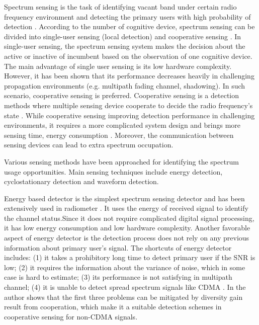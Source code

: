 Spectrum sensing is the task of identifying vacant band under certain radio frequency environment and detecting the primary users with high probability of detection  \cite{umar2012spectrum}. 
According to the number of cognitive device, spectrum sensing can be divided into single-user sensing (local detection) and cooperative sensing \cite{wang2011advances, akyildiz2011cooperative, ma2008soft, axell2010overview}. In single-user sensing, the spectrum sensing system makes the decision about the active or inactive of incumbent based on the observation of one cognitive device. The main advantage of single user sensing is its low hardware complexity. However, it has been shown that its performance decreases heavily in challenging propagation environments (e.g. multipath fading channel, shadowing). In such scenario, cooperative sensing is preferred. Cooperative sensing is a detection methods where multiple sensing device cooperate to decide the radio frequency's state \cite{ganesan2005cooperative, arslan2007cognitive}. While cooperative sensing improving detection performance in challenging environments, it requires a more complicated system design and brings more sensing time, energy consumption \cite{akyildiz2011cooperative}.  
Moreover, the communication between sensing devices can lead to extra spectrum occupation. 

Various sensing methods have been approached for identifying the spectrum usage opportunities. Main sensing techniques include  energy detection, cyclostationary detection and waveform detection. 

Energy based detector is the simplest spectrum sensing detector and has been extensively used in radiometer \cite{cabric2004implementation, poor1994introduction, urkowitz1967energy}. It uses the energy of received signal to identify the channel status.Since it does not require complicated digital signal processing, it has low energy consumption and low hardware complexity.  Another favorable aspect of energy detector is the detection process does not rely on  any previous information about primary user's signal.  
The shortcuts of energy detector includes: (1) it takes a prohibitory long time to detect primary user if the SNR is low; (2) it requires the information about the variance of noise, which in some case is hard to estimate; (3) its performance is not satisfying in multipath channel; (4) it is unable to detect spread spectrum signals like CDMA \cite{urkowitz1967energy, akyildiz2011cooperative}. 
In \cite{akyildiz2011cooperative} the author shows that the first three problems can be mitigated by diversity gain result from cooperation, which make it a suitable detection schemes in cooperative sensing for non-CDMA signals.  

